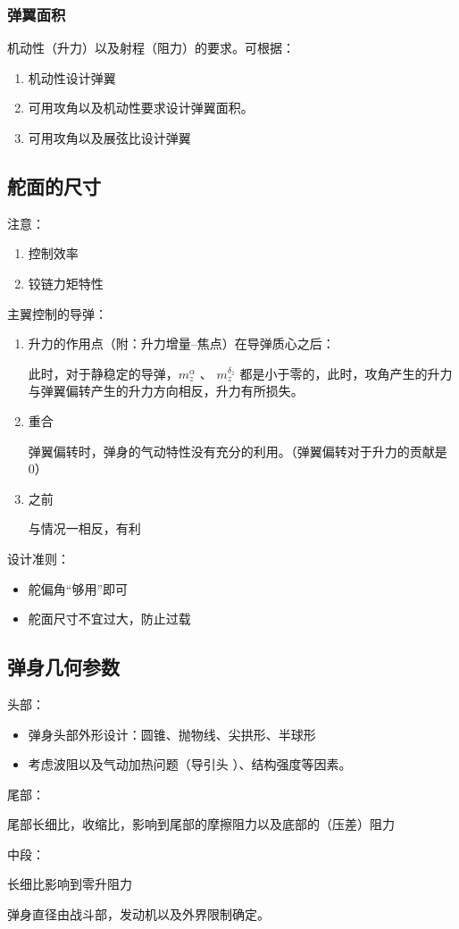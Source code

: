 \subsubsection{弹翼面积}
机动性（升力）以及射程（阻力）的要求。可根据：
\begin{enumerate}
    \item 机动性设计弹翼
    \item 可用攻角以及机动性要求设计弹翼面积。
    \item 可用攻角以及展弦比设计弹翼
\end{enumerate}
\subsection{舵面的尺寸}
注意：

\begin{enumerate}
    \item 控制效率
    \item 铰链力矩特性
\end{enumerate}
主翼控制的导弹：

\begin{enumerate}
    \item 升力的作用点（附：升力增量--焦点）在导弹质心之后：
    
    此时，对于静稳定的导弹，$m_z^{\alpha}$ 、
    $m_z^{\delta_z}$ 都是小于零的，此时，攻角产生的升力与弹翼偏转产生的升力方向相反，升力有所损失。
    \item  重合
    
    弹翼偏转时，弹身的气动特性没有充分的利用。（弹翼偏转对于升力的贡献是0）
    \item 之前
    
    与情况一相反，有利
\end{enumerate}

设计准则：

\begin{itemize}
    \item 舵偏角“够用”即可
    \item 舵面尺寸不宜过大，防止过载
\end{itemize}

\subsection{弹身几何参数}
头部：

\begin{itemize}
    \item 弹身头部外形设计：圆锥、抛物线、尖拱形、半球形
    \item 考虑波阻以及气动加热问题（导引头 ）、结构强度等因素。
\end{itemize}

尾部：

尾部长细比，收缩比，影响到尾部的摩擦阻力以及底部的（压差）阻力

中段：

长细比影响到零升阻力

弹身直径由战斗部，发动机以及外界限制确定。






